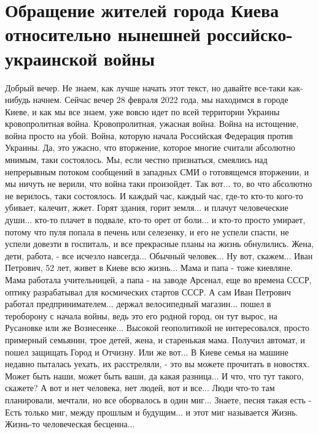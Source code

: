  
 
 
 
 

\section{Обращение жителей города Киева относительно нынешней российско-украинской войны}

Добрый вечер. Не знаем, как лучше начать этот текст, но давайте все-таки
как-нибудь начнем. Сейчас вечер 28 февраля 2022 года, мы находимся в городе
Киеве, и как мы все знаем, уже вовсю идет по всей территории Украины
кровопролитная война. Кровопролитная, ужасная война. Война на истощение, война
просто на убой. Война, которую начала Российская Федерация против Украины. Да,
это ужасно, что вторжение, которое многие считали абсолютно мнимым, таки
состоялось. Мы, если честно признаться, смеялись над непрерывным потоком
сообщений в западных СМИ о готовящемся вторжении, и мы ничуть не верили, что
война таки произойдет. Так вот... то, во что абсолютно не верилось, таки
состоялось. И каждый час, каждый час, где-то кто-то кого-то убивает, калечит,
жжет. Горят здания, горит земля... и плачут человеческие души...  кто-то плачет
в подвале, кто-то орет от боли... и кто-то просто умирает, потому что пуля
попала в печень или селезенку, и его не успели спасти, не успели довезти в
госпиталь, и все прекрасные планы на жизнь обнулились. Жена, дети, работа, -
все исчезло навсегда... Обычный человек... Ну вот, скажем...  Иван Петрович, 52
лет, живет в Киеве всю жизнь... Мама и папа - тоже киевляне.  Мама работала
учительницей, а папа - на заводе Арсенал, еще во времена СССР, оптику
разрабатывал для космических стартов СССР.  А сам Иван Петрович работал
предпринимателем... держал велосипедный магазин... пошел в тероборону с начала
войны, ведь это его родной город, он тут вырос, на Русановке или же
Вознесенке... Высокой геополитикой не интересовался, просто примерный семьянин,
трое детей, жена, и старенькая мама.  Получил автомат, и пошел защищать Город и
Отчизну. Или же вот... В Киеве семья на машине недавно пыталась уехать, их
расстреляли, - это вы можете прочитать в новостях. Может быть наши, может быть
ваши, да какая разница... И что, что тут такого, скажете? А вот и нет человека,
нет людей, вот и все... Люди что-то там планировали, мечтали, но все оборвалось
в один миг...  Знаете, песня такая есть - Есть только миг, между прошлым и
будущим... и этот миг называется Жизнь.  Жизнь-то человеческая бесценна...

